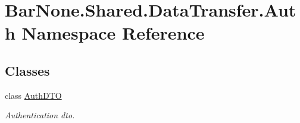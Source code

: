 \hypertarget{namespace_bar_none_1_1_shared_1_1_data_transfer_1_1_auth}{}\section{Bar\+None.\+Shared.\+Data\+Transfer.\+Auth Namespace Reference}
\label{namespace_bar_none_1_1_shared_1_1_data_transfer_1_1_auth}
\subsection*{Classes}
\begin{DoxyCompactItemize}
\item 
class \mbox{\hyperlink{class_bar_none_1_1_shared_1_1_data_transfer_1_1_auth_1_1_auth_d_t_o}{Auth\+D\+TO}}
\begin{DoxyCompactList}\small\item\em Authentication dto. \end{DoxyCompactList}\end{DoxyCompactItemize}
